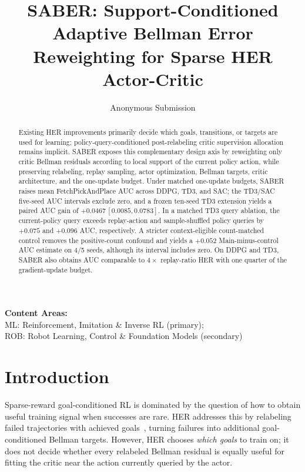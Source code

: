 \documentclass[letterpaper]{article}
\title{SABER: Support-Conditioned Adaptive Bellman Error Reweighting for Sparse HER Actor-Critic}
\author{Anonymous Submission}
\begin{document}
\maketitle

\begin{center}
\small\textbf{Content Areas:}\\
ML: Reinforcement, Imitation \& Inverse RL (primary);\\
ROB: Robot Learning, Control \& Foundation Models (secondary)
\end{center}

\begin{abstract}
Existing HER improvements primarily decide which goals, transitions, or targets are used for learning; policy-query-conditioned post-relabeling critic supervision allocation remains implicit.
SABER exposes this complementary design axis by reweighting only critic Bellman residuals according to local support of the current policy action, while preserving relabeling, replay sampling, actor optimization, Bellman targets, critic architecture, and the one-update budget.
Under matched one-update budgets, SABER raises mean FetchPickAndPlace AUC across DDPG, TD3, and SAC; the TD3/SAC five-seed AUC intervals exclude zero, and a frozen ten-seed TD3 extension yields a paired AUC gain of $+0.0467\,[0.0085,0.0783]$.
In a matched TD3 query ablation, the current-policy query exceeds replay-action and sample-shuffled policy queries by $+0.075$ and $+0.096$ AUC, respectively. A stricter context-eligible count-matched control removes the positive-count confound and yields a $+0.052$ Main-minus-control AUC estimate on 4/5 seeds, although its interval includes zero. On DDPG and TD3, SABER also obtains AUC comparable to $4\times$ replay-ratio HER with one quarter of the gradient-update budget.
\end{abstract}

\section{Introduction}

Sparse-reward goal-conditioned RL is dominated by the question of how to obtain useful training signal when successes are rare. HER addresses this by relabeling failed trajectories with achieved goals~\citep{andrychowicz2017her}, turning failures into additional goal-conditioned Bellman targets. However, HER chooses \emph{which goals} to train on; it does not decide whether every relabeled Bellman residual is equally useful for fitting the critic near the action currently queried by the actor.
\end{document}
